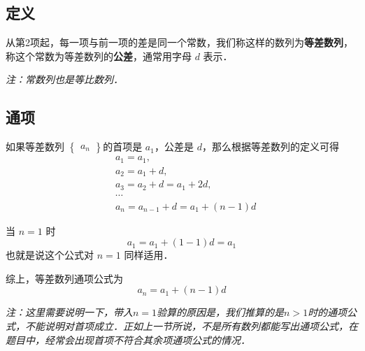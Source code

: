 
\begin{issues}
\issueDraft
\end{issues}

\subsection{定义}
从第2项起，每一项与前一项的差是同一个常数，我们称这样的数列为\textbf{等差数列}，称这个常数为等差数列的\textbf{公差}，通常用字母 $d$ 表示．

\textsl{注：常数列也是等比数列．}

\subsection{通项}
如果等差数列 $\begin{Bmatrix} a_n \end{Bmatrix}$的首项是 $a_1$，公差是 $d$，那么根据等差数列的定义可得
\begin{equation}
\begin{aligned}
&a_1 = a_1,\\
&a_2 = a_1 + d,\\
&a_3 = a_2 + d = a_1 + 2d,\\
&\cdots \\
&a_n = a_{n-1} + d = a_1 + (n - 1)d
\end{aligned}
\end{equation}

当 $n = 1$ 时
\begin{equation}
a_1 = a_1 + (1 - 1)d = a_1
\end{equation}
也就是说这个公式对 $n = 1$ 同样适用．

综上，等差数列通项公式为
\begin{equation}
a_n = a_1 + (n - 1)d
\end{equation}

\textsl{注：这里需要说明一下，带入$n = 1$验算的原因是，我们推算的是$n > 1$时的通项公式，不能说明对首项成立．正如上一节所说，不是所有数列都能写出通项公式，在题目中，经常会出现首项不符合其余项通项公式的情况．}